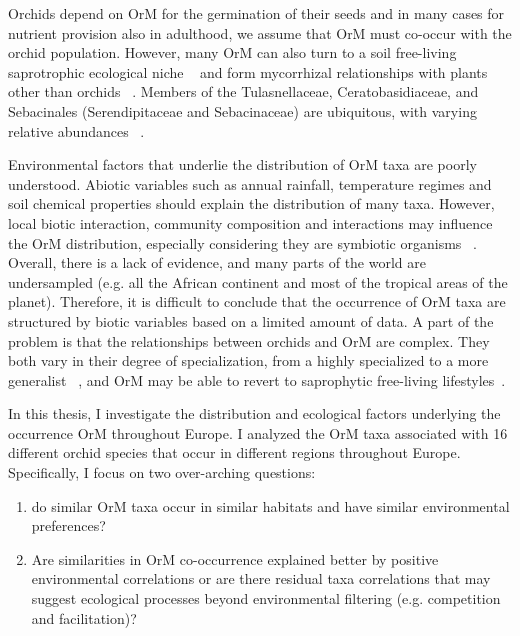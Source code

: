 Orchids depend on OrM for the germination of their seeds and in many cases for nutrient provision also in adulthood, we assume that OrM must co-occur with the orchid population. However, many OrM can also turn to a soil free-living saprotrophic ecological niche ~\citep{oberwinkler2017} and form mycorrhizal relationships with plants other than orchids ~\citep{selosse2014}. Members of the Tulasnellaceae, Ceratobasidiaceae, and Sebacinales (Serendipitaceae and Sebacinaceae) are ubiquitous, with varying relative abundances ~\citep{jacquemyn2017}.

Environmental factors that underlie the distribution of OrM taxa are poorly understood. Abiotic variables such as annual rainfall, temperature regimes and soil chemical properties should explain the distribution of many taxa. However, local biotic interaction, community composition and interactions may influence the OrM distribution, especially considering they are symbiotic organisms ~\citep{jacquemyn2017}. Overall, there is a lack of evidence, and many parts of the world are undersampled (e.g. all the African continent and most of the tropical areas of the planet). Therefore, it is difficult to conclude that the occurrence of OrM taxa are structured by biotic variables based on a limited amount of data. A part of the problem is that the relationships between orchids and OrM are complex. They both vary in their degree of specialization, from a highly specialized to a more generalist ~\citep{mccormick2004, girlanda2011, heijden2015}, and OrM may be able to revert to saprophytic free-living lifestyles~\citep{veldre2013}.

In this thesis, I investigate the distribution and ecological factors underlying the occurrence OrM throughout Europe. I analyzed the OrM taxa associated with 16 different orchid species that occur in different regions throughout Europe. Specifically, I focus on two over-arching questions:

\begin{enumerate}
\item do similar OrM taxa occur in similar habitats and have similar environmental preferences?

\item Are similarities in OrM co-occurrence explained better by positive environmental correlations or are there residual taxa correlations that may suggest ecological processes beyond environmental filtering (e.g. competition and facilitation)?

\end{enumerate}


